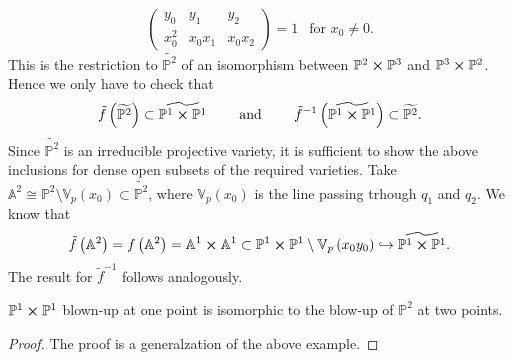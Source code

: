 \begin{ex}
\begin{equation}
	\begin{pmatrix}
		y_0 & y_1 & y_2\\
		x_0^2 & x_0x_1 & x_0x_2
	\end{pmatrix} = 1
	\ \ \text{ for } x_0 \neq 0
	.\end{equation} 
	This is the restriction to $\widetilde{\mathbb{P}^{2}}$ of an isomorphism between
	$\mathbb{P}^{2} \cross \mathbb{P}^{3}$ and $\mathbb{P}^{3} \cross \mathbb{P}^{2}$.
	Hence we only have to check that
	\begin{equation}
		\tilde{f} \left( \widetilde{\mathbb{P}^{2}} \right) \subset \widetilde{\mathbb{P}^{1} \cross \mathbb{P}^{1}}
		\qquad \text{ and } \qquad
		\tilde{f}^{-1} \left( \widetilde{\mathbb{P}^{1} \cross \mathbb{P}^{1}} \right) \subset
		\widetilde{\mathbb{P}^{2}}
	.\end{equation} 
	Since $\widetilde{\mathbb{P}^{2}}$ is an irreducible projective variety, it is sufficient 
	to show the above inclusions for dense open subsets of the required varieties.
	Take $\mathbb{A}^{2} \cong \mathbb{P}^{2} \setminus \mathbb{V}_p\left( x_0 \right) \subset \widetilde{\mathbb{P}^{2}}$,
	where $\mathbb{V}_p\left( x_0 \right)$ is the line passing trhough $q_1$ and $q_2$.
	We know that
	\begin{equation}
		\tilde{f} \left(  \mathbb{A}^{2} \right) = f \left( \mathbb{A}^{2} \right) =
		\mathbb{A}^{1} \cross \mathbb{A}^{1} \subset
		\mathbb{P}^{1} \cross \mathbb{P}^{1} \setminus \mathbb{V}_p\left( x_0y_0 \right)
		\hookrightarrow \widetilde{\mathbb{P}^{1} \cross \mathbb{P}^{1}}
	.\end{equation} 
	The result for $\tilde{f}^{-1}$ follows analogously.
\end{ex} 

\begin{lem}
	$\mathbb{P}^{1} \cross \mathbb{P}^{1}$ blown-up at one point is isomorphic to the blow-up 
	of $\mathbb{P}^{2}$ at two points.
\end{lem} 
\begin{proof}
	The proof is a generalzation of the above example.
\end{proof}
